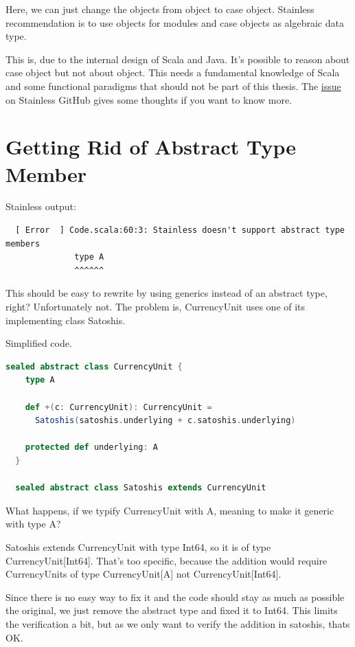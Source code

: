 Here, we can just change the objects from object to case object.
Stainless recommendation is to use objects for modules and case objects as algebraic data type.

This is, due to the internal design of Scala and Java.
It's possible to reason about case object but not about object.
This needs a fundamental knowledge of Scala and some functional paradigms that should not be part of this thesis.
The \href{https://github.com/epfl-lara/stainless/issues/520}{issue } on Stainless GitHub gives some thoughts if you want to know more.


\section{Getting Rid of Abstract Type Member}

Stainless output:
{\footnotesize\begin{verbatim}
  [ Error  ] Code.scala:60:3: Stainless doesn't support abstract type members
              type A
              ^^^^^^
\end{verbatim}}

This should be easy to rewrite by using generics instead of an abstract type, right?
Unfortunately not.
The problem is, CurrencyUnit uses one of its implementing class Satoshis.

Simplified code.
\begin{lstlisting}[language=scala]
  sealed abstract class CurrencyUnit {
    type A

    def +(c: CurrencyUnit): CurrencyUnit =
      Satoshis(satoshis.underlying + c.satoshis.underlying)

    protected def underlying: A
  }

  sealed abstract class Satoshis extends CurrencyUnit
\end{lstlisting}

What happens, if we typify CurrencyUnit with A, meaning to make it generic with type A?

Satoshis extends CurrencyUnit with type Int64, so it is of type CurrencyUnit[Int64].
That's too specific, because the addition would require CurrencyUnits of type CurrencyUnit[A] not CurrencyUnit[Int64].

Since there is no easy way to fix it and the code should stay as much as possible the original, we just remove the abstract type and fixed it to Int64.
This limits the verification a bit, but as we only want to verify the addition in satoshis, thats OK.


